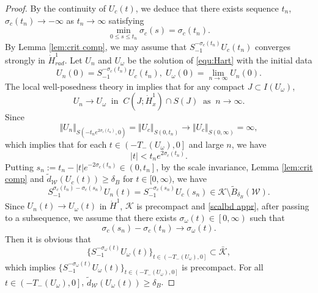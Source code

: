 \documentclass[reqno, 11pt]{amsart}
\numberwithin{equation}{section}
\theoremstyle{plain}
\theoremstyle{definition}
\numberwithin{equation}{section}
\numberwithin{theorem}{section}
\numberwithin{equation}{section}
\numberwithin{equation}{section}
\numberwithin{theorem}{section}
\begin{document}
\begin{proof}
		By the continuity of $U_c(t)$, we deduce that there exists sequence $t_n$, $\sigma_{c}(t_n)\to -\infty$ as $t_n\to \infty$ satisfying
		\begin{equation}\label{scalbd appr}
		\min_{0\leq s\leq t_n}\sigma_{c}(s)=\sigma_{c}(t_n).
		\end{equation}
		By Lemma \ref{lem:crit comp}, we may assume that $S_{-1}^{-\sigma_{c}(t_n)}U_c(t_n)$ converges strongly in $\dot{H}_{rad}^{1}$. Let $U_n$ and $U_{\omega}$ be the solution of \eqref{equ:Hart} with the initial data
		\begin{equation*}
		U_n(0)=S_{-1}^{-\sigma_{c}(t_n)}U_c(t_n),\;U_{\omega}(0)=\lim_{n \to \infty}U_n(0).
		\end{equation*}
		The local well-posedness theory in \cite[Proposition 2.1]{MXZ:crit Hart:f rad} implies that for any compact $J\subset I(U_{\omega})$,
		\begin{equation*}
		U_n\to U_{\omega}\;\;\text{in}\;\;C(J;\dot{H}_{x}^{1})\cap S(J)\;\;\text{as}\;\;n\to \infty.
		\end{equation*}
		Since 
		\begin{equation}\label{conve in S}
		\Vert U_n \Vert_{S(-t_n e^{2\sigma_{c}(t_n)},0)}=\Vert U_c \Vert_{S(0,t_n)} \to \Vert U_c \Vert_{S(0,\infty)}=\infty,
		\end{equation}
		which implies that for each $t\in \left(-T_-(U_{\omega}),0\right]$ and large $n$, we have
		\begin{equation*}
		|t|<t_n e^{2\sigma_{c}(t_n)}.
		\end{equation*}
		Putting $s_n:=t_n-|t|e^{-2\sigma_{c}(t_n)}\in \left(0,t_n \right]$, by the scale invariance, Lemma \ref{lem:crit comp} and $\widetilde{d}_{\mathcal{W}}(U_c(t))\geq \delta_{B}$ for $t\in[0,\infty)$, we have
		\begin{equation*}
		S_{-1}^{\sigma_{c}(t_n)-\sigma_{c}(s_n)}U_n(t)=S_{-1}^{-\sigma_{c}(s_n)}U_c(s_n)\in \mathscr{K}\setminus \widetilde{B}_{\delta_{B}}(\mathcal{W}).
		\end{equation*}
		Since $U_n(t)\to U_{\omega}(t)$ in $\dot{H}^1$, $\mathscr{K}$ is precompact and \eqref{scalbd appr}, after passing to a subsequence, we assume that there exists  $\sigma_{\omega}(t)\in \left[0,\infty \right)$ such that
		\begin{equation*}
		\sigma_{c}(s_n)-\sigma_{c}(t_n)\rightarrow \sigma_{\omega}(t).
		\end{equation*}
		Then it is obvious that
		\begin{equation*}
		\{ S_{-1}^{-\sigma_{\omega}(t)}U_{\omega}(t) \}_{t\in \left(-T_-(U_{\omega}),0\right]}\subset \bar{\mathscr{K}},
		\end{equation*}
		which implies $\{ S_{-1}^{-\sigma_{\omega}(t)}U_{\omega}(t) \}_{t\in \left(-T_-(U_{\omega}),0\right]}$ is precompact. For all $t\in \left(-T_-(U_{\omega}),0 \right]$, $\widetilde{d}_{\mathcal{W}}(U_{\omega}(t))\geq \delta_{B}$.
		

\end{proof}
\end{document}

